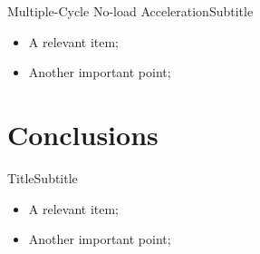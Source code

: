     \begin{frame}{Multiple-Cycle No-load Acceleration}{Subtitle}\vspace*{-2em}
        \begin{itemize}
            \item<2->  A \alert{relevant} item;
            \item<3->  Another \alert{important} point;
        \end{itemize}
    \end{frame}

\section{Conclusions}

    \begin{frame}{Title}{Subtitle}\vspace*{-2em}
        \begin{itemize}
            \item<2->  A \alert{relevant} item;
            \item<3->  Another \alert{important} point;
        \end{itemize}
    \end{frame}





